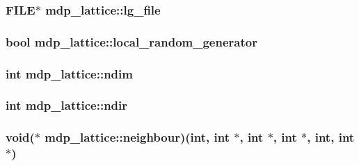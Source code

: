 \label{classmdp__lattice_a1f2238902be88b61a3cc677f912210ea}
\hypertarget{classmdp__lattice_a3c0a480cd7f6bf31cd8dbffd87e57ac3}{
\subsubsection[{lg\_\-file}]{\setlength{\rightskip}{0pt plus 5cm}FILE$\ast$ {\bf mdp\_\-lattice::lg\_\-file}}}
\label{classmdp__lattice_a3c0a480cd7f6bf31cd8dbffd87e57ac3}
\hypertarget{classmdp__lattice_a7ff104adddc120fec711a17ae53fd6bf}{
\subsubsection[{local\_\-random\_\-generator}]{\setlength{\rightskip}{0pt plus 5cm}bool {\bf mdp\_\-lattice::local\_\-random\_\-generator}}}
\label{classmdp__lattice_a7ff104adddc120fec711a17ae53fd6bf}
\hypertarget{classmdp__lattice_a215127d8822ab086ff06fdbc815fae91}{
\subsubsection[{ndim}]{\setlength{\rightskip}{0pt plus 5cm}int {\bf mdp\_\-lattice::ndim}}}
\label{classmdp__lattice_a215127d8822ab086ff06fdbc815fae91}
\hypertarget{classmdp__lattice_ace466601bc3fb9815648d775793985eb}{
\subsubsection[{ndir}]{\setlength{\rightskip}{0pt plus 5cm}int {\bf mdp\_\-lattice::ndir}}}
\label{classmdp__lattice_ace466601bc3fb9815648d775793985eb}
\hypertarget{classmdp__lattice_a70e86c99c7ff38cf408c4b0a303f2cf8}{
\subsubsection[{neighbour}]{\setlength{\rightskip}{0pt plus 5cm}void($\ast$ {\bf mdp\_\-lattice::neighbour})(int, int $\ast$, int $\ast$, int $\ast$, int, int $\ast$)}}
